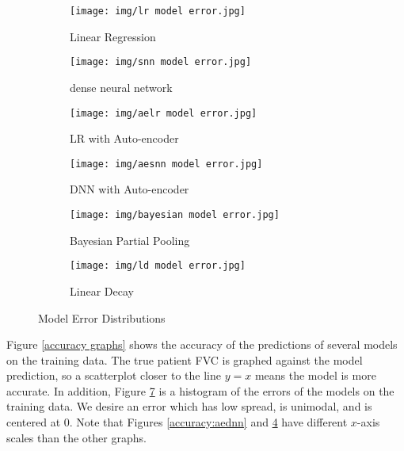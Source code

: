 \documentclass[12pt]{article}
\begin{document}
\begin{figure}[h!]
    \centering

    \begin{subfigure}{.32\textwidth}
        \centering
        \texttt{[image: img/lr model error.jpg]}
        \caption{Linear Regression}
        \label{error:lr}
    \end{subfigure}
    \begin{subfigure}{.32\textwidth}
        \centering
        \texttt{[image: img/snn model error.jpg]}
        \caption{dense neural network}
        \label{error:dnn}
    \end{subfigure}
    \begin{subfigure}{.32\textwidth}
        \centering
        \texttt{[image: img/aelr model error.jpg]}
        \caption{LR with Auto-encoder}
        \label{error:aelr}
    \end{subfigure}

    \vspace{0.5em}

    \begin{subfigure}{.32\textwidth}
        \centering
        \texttt{[image: img/aesnn model error.jpg]}
        \caption{DNN with Auto-encoder}
        \label{error:aednn}
    \end{subfigure}
    \begin{subfigure}{.32\textwidth}
        \centering
        \texttt{[image: img/bayesian model error.jpg]}
        \caption{Bayesian Partial Pooling}
        \label{error:bpp}
    \end{subfigure}
    \begin{subfigure}{.32\textwidth}
        \centering
        \texttt{[image: img/ld model error.jpg]}
        \caption{Linear Decay}
        \label{error:ld}
    \end{subfigure}

    \caption{Model Error Distributions}
    \label{error graphs}
\end{figure}

Figure \ref{accuracy graphs} shows the accuracy of the predictions of several models on the training data. 
The true patient FVC is graphed against the model prediction, so a scatterplot closer to the line $y=x$ means the model is more accurate.
In addition, Figure \ref{error graphs} is a histogram of the errors of the models on the training data. 
We desire an error which has low spread, is unimodal, and is centered at 0.
Note that Figures \ref{accuracy:aednn} and \ref{error:aednn} have different $x$-axis scales than the other graphs. 
\end{document}

